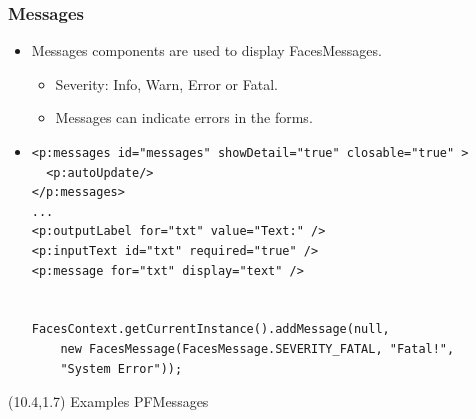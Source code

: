 \documentclass[10pt,xcolor=pdflatex]{beamer}
\begin{document}
\begin{frame}[containsverbatim]\frametitle{Messages}
  \begin{itemize}
    \item Messages components are used to display FacesMessages.
	  \begin{itemize}
		\item Severity: Info, Warn, Error or Fatal.
        \item Messages can indicate errors in the forms.
	  \end{itemize}
    \item[] \begin{footnotesize}
    \begin{verbatim}
<p:messages id="messages" showDetail="true" closable="true" >
  <p:autoUpdate/>
</p:messages>
...
<p:outputLabel for="txt" value="Text:" />
<p:inputText id="txt" required="true" />
<p:message for="txt" display="text" />


FacesContext.getCurrentInstance().addMessage(null, 
    new FacesMessage(FacesMessage.SEVERITY_FATAL, "Fatal!", 
    "System Error"));

    \end{verbatim}
    \end{footnotesize}
  \end{itemize}
\begin{textblock}{10}(10.4,1.7)
    {\footnotesize Examples PFMessages}
\end{textblock}
\end{frame}
\end{document}
